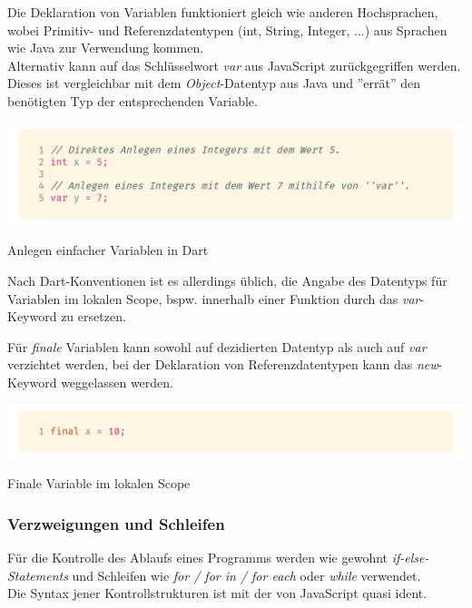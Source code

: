 Die Deklaration von Variablen funktioniert gleich wie anderen Hochsprachen,
wobei Primitiv- und Referenzdatentypen (int, String, Integer, ...) aus Sprachen wie Java zur Verwendung
kommen.\\
Alternativ kann auf das Schlüsselwort \textit{var} aus JavaScript zurückgegriffen werden. Dieses
ist vergleichbar mit dem \textit{Object}-Datentyp aus Java und ''errät'' den benötigten
Typ der entsprechenden Variable.

\begin{code}
    \centering
    \includegraphics[width=1\textwidth]{images/Dart/dartVariables.png}
    \caption{Anlegen einfacher Variablen in Dart}
\end{code}

Nach Dart-Konventionen ist es allerdings üblich, die Angabe des Datentyps für Variablen 
im lokalen Scope, bspw. innerhalb einer Funktion durch das \textit{var}-Keyword zu ersetzen.

Für \textit{finale} Variablen kann sowohl auf dezidierten Datentyp als auch auf \textit{var} 
verzichtet werden, bei der Deklaration von Referenzdatentypen kann das \textit{new}-Keyword 
weggelassen werden.

\begin{code}
    \centering
    \includegraphics[width=1\textwidth]{images/Dart/dartLocalFinal.png}
    \caption{Finale Variable im lokalen Scope}
\end{code}

\subsubsection{Verzweigungen und Schleifen}

Für die Kontrolle des Ablaufs eines Programms werden wie gewohnt \textit{if-else-Statements} und Schleifen
wie \textit{for / for in / for each} oder \textit{while} verwendet.\\
Die Syntax jener Kontrollstrukturen ist mit der von JavaScript quasi ident.

